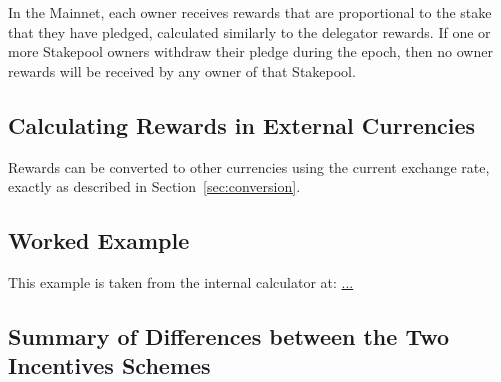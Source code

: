 \documentclass[11pt,a4paper,dvipsnames,twosided,final]{article}
\begin{document}
\noindent
In the Mainnet, each owner receives rewards that are proportional to the stake that they have pledged,
calculated similarly to the delegator rewards.  If one or more Stakepool owners withdraw their pledge during the epoch, then
no owner rewards will be received by any owner of that Stakepool.


\subsection{Calculating Rewards in External Currencies}

Rewards can be converted to other currencies using the current exchange rate, exactly as described in
Section~\ref{sec:conversion}.

\subsection{Worked Example}


This example is taken from the \IOHK{} internal calculator at:
\url{...}


\subsection{Summary of Differences between the Two Incentives Schemes}
\label{sec:summary}
\end{document}
